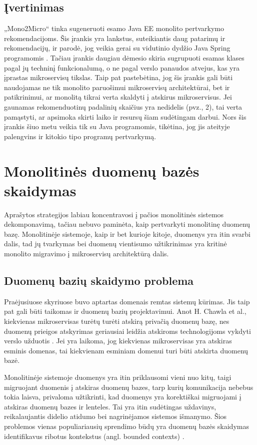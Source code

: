 \documentclass[fleqn]{VUMIFPSkursinis}
\begin{document}
\subsection{Įvertinimas}
„Mono2Micro“ tinka sugeneruoti esamo Java EE monolito pertvarkymo rekomendacijoms. Šis įrankis yra lankstus, suteikiantis daug patarimų ir rekomendacijų, ir parodė, jog veikia gerai su vidutinio dydžio Java Spring programomis \cite{San21}. Tačiau įrankis daugiau dėmesio skiria sugrupuoti esamas klases pagal jų techninį funkcionalumą, o ne pagal verslo panaudos atvejus, kas yra įprastas mikroservisų tikslas. Taip pat pastebėtina, jog šis įrankis gali būti naudojamas ne tik monolito paruošimui mikroservisų architektūrai, bet ir patikrinimui, ar monolitą tikrai verta skaldyti į atskirus mikroservisus. Jei gaunamas rekomenduotinų padalinių skaičius yra nedidelis (pvz., 2), tai verta pamąstyti, ar apsimoka skirti laiko ir resursų šiam sudėtingam darbui. Nors šis įrankis šiuo metu veikia tik su Java programomis, tikėtina, jog jis ateityje palengvins ir kitokio tipo programų pertvarkymą.

\section{Monolitinės duomenų bazės skaidymas}
Aprašytos strategijos labiau koncentravosi į pačios monolitinės sistemos dekomponavimą, tačiau nebuvo paminėta, kaip pertvarkyti monolitinę duomenų bazę. Monolitinėje sistemoje, kaip ir bet kurioje kitoje, duomenys yra itin svarbi dalis, tad jų tvarkymas bei duomenų vientisumo užtikrinimas yra kritinė monolito migravimo į mikroservisų architektūrą dalis.

\subsection{Duomenų bazių skaidymo problema}
Praėjusiuose skyriuose buvo aptartas domenais remtas sistemų kūrimas. Jis taip pat gali būti taikomas ir duomenų bazių projektavimui. Anot H. Chawla et al., kiekvienas mikroservisas turėtų turėti atskirą privačią duomenų bazę, nes duomenų prieigos atskyrimas geriausiai leidžia atskiroms technologijoms vykdyti verslo užduotis \cite{CK19}. Jei yra laikoma, jog kiekvienas mikroservisas yra atskiras esminis domenas, tai kiekvienam esminiam domenui turi būti atskirta duomenų bazė.

Monolitinėje sistemoje duomenys yra itin priklausomi vieni nuo kitų, taigi migruojant duomenis į atskiras duomenų bazes, tarp kurių komunikacija nebebus tokia laisva, privaloma užtikrinti, kad duomenys yra korektiškai migruojami į atskiras duomenų bazes ir lenteles. Tai yra itin sudėtingas uždavinys, reikalaujantis didelio atidumo bei nagrinėjamos sistemos išmanymo. Šios problemos vienas populiariausių sprendimo būdų yra duomenų bazės skaidymas identifikavus ribotus kontekstus (angl. bounded contexts) \cite{New19}.
\end{document}
